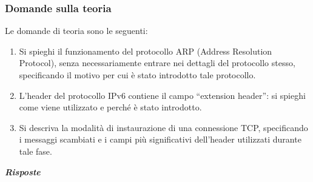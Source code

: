 \documentclass[a4paper]{article}
\newcommand{\dquotes}[1]{``#1''}
\begin{document}
	\subsubsection{Domande sulla teoria}
	Le domande di teoria sono le seguenti:
	\begin{enumerate}
		\item Si spieghi il funzionamento del protocollo ARP (Address Resolution Protocol), senza necessariamente entrare nei dettagli del protocollo stesso, specificando il motivo per cui è stato introdotto tale protocollo.
		
		\item L'header del protocollo IPv6 contiene il campo \dquotes{extension header}: si spieghi come viene utilizzato e perché è stato introdotto.\label{IPv6 extension header}
		
		\item Si descriva la modalità di instaurazione di una connessione TCP, specificando i messaggi scambiati e i campi più significativi dell'header utilizzati durante tale fase.
	\end{enumerate}
	\textcolor{Green4}{\textbf{\emph{Risposte}}}
\end{document}
